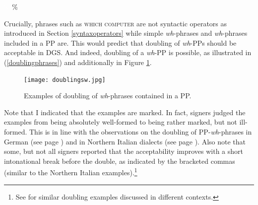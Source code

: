 
\begin{exe}
\ex\label{whphrasesinappdgs}
\begin{xlist}
\ex \textcolor{white}{\%}
%
\ex \%
%
\end{xlist}
\end{exe}


\noindent Crucially, phrases such as \textsc{which computer} are not syntactic operators as introduced in Section \ref{syntaxoperators} while simple \textit{wh}-phrases and \textit{wh}-phrases included in a PP are. This would predict that doubling of \textit{wh}-PPs should be acceptable in DGS. And indeed, doubling of a \textit{wh}-PP is possible, as illustrated in (\ref{doublingphrases}) and additionally in Figure \ref{whdoublinggg}. 

\begin{figure}[bt]
\centering
	\texttt{[image: doublingsw.jpg]}
	\caption{Examples of doubling of \textit{wh}-phrases contained in a PP.}
	\label{whdoublinggg}
\end{figure}

Note that I indicated that the examples are marked. In fact, signers judged the examples from being absolutely well-formed to being rather marked, but not ill-formed. This is in line with the observations on the doubling of PP-\textit{wh}-phrases in German (see page \pageref{whcopyinggermanb}) and in Northern Italian dialects (see page \pageref{morenorthernitalianab}). Also note that some, but not all signers reported that the acceptability improves with a short intonational break before the double, as indicated by the bracketed commas (similar to the Northern Italian examples).\footnote{See \citet[324--325]{happ2014vork} for similar doubling examples discussed in different contexts. } 


